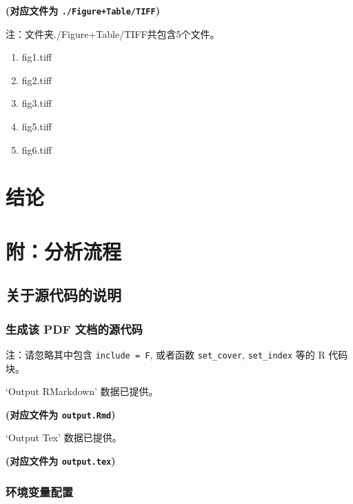 \documentclass[
]{article}
\providecommand{\tightlist}{%
  \setlength{\itemsep}{0pt}\setlength{\parskip}{0pt}}
\begin{document}
\textbf{(对应文件为 \texttt{./Figure+Table/TIFF})}

\begin{center}\begin{tcolorbox}[colback=gray!10, colframe=gray!50, width=0.9\linewidth, arc=1mm, boxrule=0.5pt]注：文件夹./Figure+Table/TIFF共包含5个文件。

\begin{enumerate}\tightlist
\item fig1.tiff
\item fig2.tiff
\item fig3.tiff
\item fig5.tiff
\item fig6.tiff
\end{enumerate}\end{tcolorbox}
\end{center}

\hypertarget{dis}{%
\section{结论}\label{dis}}

\hypertarget{workflow}{%
\section{附：分析流程}\label{workflow}}

\hypertarget{code}{%
\subsection{关于源代码的说明}\label{code}}

\hypertarget{ux751fux6210ux8be5-pdf-ux6587ux6863ux7684ux6e90ux4ee3ux7801}{%
\subsubsection{生成该 PDF 文档的源代码}\label{ux751fux6210ux8be5-pdf-ux6587ux6863ux7684ux6e90ux4ee3ux7801}}

注：请忽略其中包含 \texttt{include\ =\ F}, 或者函数 \texttt{set\_cover}, \texttt{set\_index} 等的 R 代码块。

`Output RMarkdown' 数据已提供。

\textbf{(对应文件为 \texttt{output.Rmd})}

`Output Tex' 数据已提供。

\textbf{(对应文件为 \texttt{output.tex})}

\hypertarget{ux73afux5883ux53d8ux91cfux914dux7f6e}{%
\subsubsection{环境变量配置}\label{ux73afux5883ux53d8ux91cfux914dux7f6e}}
\end{document}
